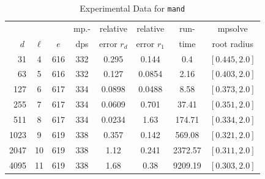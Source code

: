 \documentclass[runningheads]{llncs}
\begin{document}
\begin{table}
\caption{Experimental Data for \texttt{mand}} %
\label{tab:mand}
\vskip -0.15in
\begin{center}
\begin{small}
\begin{sc}
\begin{tabular}{rccccccc}
\toprule
&  &  & mp.-& relative  & relative & run- & mpsolve \\
$d~$& $\ell$& $e$ & dps&error $r_d$       & error $r_1$ &time& root radius\\
\midrule
   31 & 4 & 616 & 332 & 0.295 & 0.144 & 0.4 & $[0.445, 2.0]$\\
   63 & 5 & 616 & 332 & 0.127 & 0.0854 & 2.16 & $[0.403, 2.0]$\\
 127 & 6 & 617 & 334 & 0.0898 & 0.0488 & 8.58 & $[0.373, 2.0]$\\
 255 & 7 & 617 & 334 & 0.0609 & 0.701 & 37.41 & $[0.351, 2.0]$\\
 511 & 8 & 617 & 334 & 0.0234 & 1.63 & 174.71 & $[0.334, 2.0]$\\
1023 & 9 & 619 & 338 & 0.357 & 0.142 & 569.08 & $[0.321, 2.0]$\\
2047 & 10 & 619 & 338 & 1.12 & 0.241 & 2372.57 & $[0.311, 2.0]$\\
4095 & 11 & 619 & 338 & 1.68 & 0.38 & 9209.19 & $[0.303, 2.0]$\\
\bottomrule
\end{tabular}
\end{sc}
\end{small}
\end{center}
\vskip 0.05in
\end{table}
\end{document}
